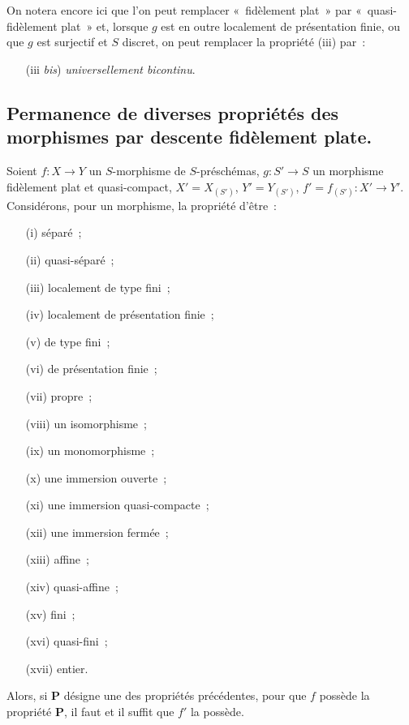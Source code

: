 On notera encore ici que l'on peut remplacer «~fidèlement plat~» par
«~quasi-fidèlement plat~» et, lorsque $g$ est en outre localement de
présentation finie, ou que $g$ est surjectif et $S$ discret, on peut remplacer
la propriété (iii) par~:
\begin{enumerate}
\item[(iii \emph{bis})] \emph{universellement bicontinu}.
\end{enumerate}

\subsection{Permanence de diverses propriétés des morphismes par descente
fidèlement plate.}
\label{subsection:IV.2.7-fr}

\begin{proposition}[2.7.1]
\label{IV.2.7.1-fr}
Soient $f:X\to Y$ un $S$-morphisme de $S$-préschémas, $g:S'\to S$ un
morphisme fidèlement plat et quasi-compact, $X'=X_{(S')}$, $Y'=Y_{(S')}$,
$f'=f_{(S')}:X'\to Y'$. Considérons, pour un morphisme, la propriété d'être~:
\begin{enumerate}
\item[\textup{(i)}] séparé~;
\item[\textup{(ii)}] quasi-séparé~;
\item[\textup{(iii)}] localement de type fini~;
\item[\textup{(iv)}] localement de présentation finie~;
\item[\textup{(v)}] de type fini~;
\item[\textup{(vi)}] de présentation finie~;
\item[\textup{(vii)}] propre~;
\item[\textup{(viii)}] un isomorphisme~;
\item[\textup{(ix)}] un monomorphisme~;
\item[\textup{(x)}] une immersion ouverte~;
\item[\textup{(xi)}] une immersion quasi-compacte~;
\item[\textup{(xii)}] une immersion fermée~;
\item[\textup{(xiii)}] affine~;
\item[\textup{(xiv)}] quasi-affine~;
\item[\textup{(xv)}] fini~;
\item[\textup{(xvi)}] quasi-fini~;
\item[\textup{(xvii)}] entier.
\end{enumerate}
Alors, si $\boldsymbol{P}$ désigne une des propriétés précédentes, pour que $f$ possède la
propriété $\boldsymbol{P}$, il faut et il suffit que $f'$ la possède.
\end{proposition}

